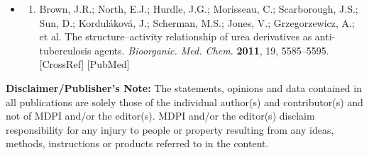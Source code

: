 \documentclass{article}
\begin{document}
\begin{itemize}
\begin{enumerate}
\end{enumerate}

\item \begin{enumerate}
\item 
Brown, J.R.; North, E.J.; Hurdle, J.G.; Morisseau, C.; Scarborough, J.S.; Sun, D.; Korduláková, J.; Scherman, M.S.; Jones, V.; Grzegorzewicz, A.; et al. The structure–activity relationship of urea derivatives as anti-tuberculosis agents. \textit{Bioorganic. Med. Chem.} \textbf{2011}, 19, 5585–5595. [CrossRef] [PubMed]

\end{enumerate}

\end{itemize}

\textbf{Disclaimer/Publisher's Note:} The statements, opinions and data contained in all publications are solely those of the individual author(s) and contributor(s) and not of MDPI and/or the editor(s). MDPI and/or the editor(s) disclaim responsibility for any injury to people or property resulting from any ideas, methods, instructions or products referred to in the content.
\end{document}
